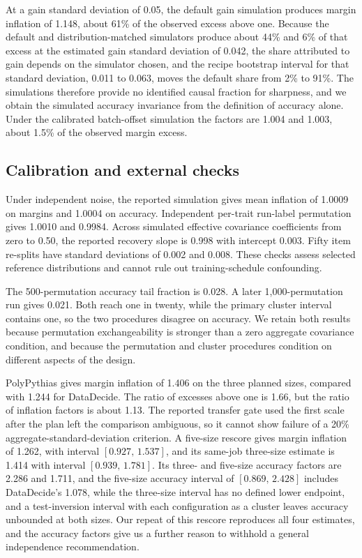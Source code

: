\documentclass{article}
\newcommand{\ci}[2]{\ensuremath{[#1,\,#2]}}
\begin{document}
At a gain standard deviation of 0.05, the default gain simulation produces margin inflation of 1.148, about 61\% of the observed excess above one. Because the default and distribution-matched simulators produce about 44\% and 6\% of that excess at the estimated gain standard deviation of 0.042, the share attributed to gain depends on the simulator chosen, and the recipe bootstrap interval for that standard deviation, 0.011 to 0.063, moves the default share from 2\% to 91\%. The simulations therefore provide no identified causal fraction for sharpness, and we obtain the simulated accuracy invariance from the definition of accuracy alone. Under the calibrated batch-offset simulation the factors are 1.004 and 1.003, about 1.5\% of the observed margin excess.

\subsection{Calibration and external checks}
Under independent noise, the reported simulation gives mean inflation of 1.0009 on margins and 1.0004 on accuracy. Independent per-trait run-label permutation gives 1.0010 and 0.9984. Across simulated effective covariance coefficients from zero to 0.50, the reported recovery slope is 0.998 with intercept 0.003. Fifty item re-splits have standard deviations of 0.002 and 0.008. These checks assess selected reference distributions and cannot rule out training-schedule confounding.

The 500-permutation accuracy tail fraction is 0.028. A later 1,000-permutation run gives 0.021. Both reach one in twenty, while the primary cluster interval contains one, so the two procedures disagree on accuracy. We retain both results because permutation exchangeability is stronger than a zero aggregate covariance condition, and because the permutation and cluster procedures condition on different aspects of the design.

PolyPythias gives margin inflation of 1.406 on the three planned sizes, compared with 1.244 for DataDecide. The ratio of excesses above one is 1.66, but the ratio of inflation factors is about 1.13. The reported transfer gate used the first scale after the plan left the comparison ambiguous, so it cannot show failure of a 20\% aggregate-standard-deviation criterion. A five-size rescore gives margin inflation of 1.262, with interval \ci{0.927}{1.537}, and its same-job three-size estimate is 1.414 with interval \ci{0.939}{1.781}. Its three- and five-size accuracy factors are 2.286 and 1.711, and the five-size accuracy interval of \ci{0.869}{2.428} includes DataDecide's 1.078, while the three-size interval has no defined lower endpoint, and a test-inversion interval with each configuration as a cluster leaves accuracy unbounded at both sizes. Our repeat of this rescore reproduces all four estimates, and the accuracy factors give us a further reason to withhold a general independence recommendation.
\end{document}
